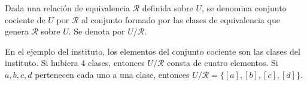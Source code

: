 \begin{TFGampliado}
    \begin{deff}{\cite[p.~79]{LenguajePineda}}
        Dada una relación de equivalencia $\mathcal{R}$ definida sobre $U$, se denomina conjunto cociente de $U$ por $\mathcal{R}$ al conjunto formado por las clases de equivalencia que genera $\mathcal{R}$ sobre $U$. Se denota por $U / \mathcal{R}$.
    \end{deff}

    
    \begin{obs}
        \item En el ejemplo del instituto, los elementos del conjunto cociente son las clases del instituto. Si hubiera 4 clases, entonces $U/\mathcal{R}$ consta de cuatro elementos. Si $a,b,c,d$ pertenecen cada uno a una clase, entonces $U/\mathcal{R} = \{[a],[b],[c],[d]\}$.


\end{obs}
\end{TFGampliado}
